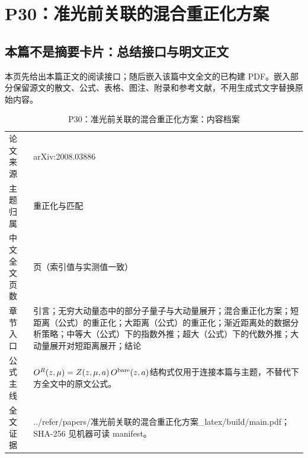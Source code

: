 \documentclass[UTF8,11pt,oneside]{ctexbook}
\begin{document}
\chapter{P30：准光前关联的混合重正化方案}
\section*{本篇不是摘要卡片：总结接口与明文正文}
本页先给出本篇正文的阅读接口；随后嵌入该篇中文全文的已构建 PDF。嵌入部分保留源文的散文、公式、表格、图注、附录和参考文献，不用生成式文字替换原始内容。
\begin{table}[htbp]
  \centering
  \caption{P30：准光前关联的混合重正化方案：内容档案}
  \small
  \begin{tabularx}{0.96\textwidth}{@{}p{3.3cm}>{\raggedright\arraybackslash}X@{}}
    \toprule
    论文来源 & arXiv:2008.03886 \\
    主题归属 & 重正化与匹配 \\
    中文全文页数 & 24 页（索引值与实测值一致） \\
    章节入口 & 引言；无穷大动量态中的部分子量子与大动量展开；混合重正化方案；短距离（公式）的重正化；大距离（公式）的重正化；渐近距离处的数据分析策略；中等大（公式）下的指数外推；超大（公式）下的代数外推；大动量展开对短距离展开；结论 \\
    公式主线 & $O^{R}(z,\mu)=Z(z,\mu,a)\,O^{\rm bare}(z,a)$\newline\scriptsize 结构式仅用于连接本篇与主题，不替代下方全文中的原文公式。 \\
    全文证据 & ../\allowbreak{}refer/\allowbreak{}papers/\allowbreak{}准光前关联的混合重正化方案\_\allowbreak{}latex/\allowbreak{}build/\allowbreak{}main.pdf；SHA-256 见机器可读 manifest。 \\
    \bottomrule
  \end{tabularx}
\end{table}
\end{document}
